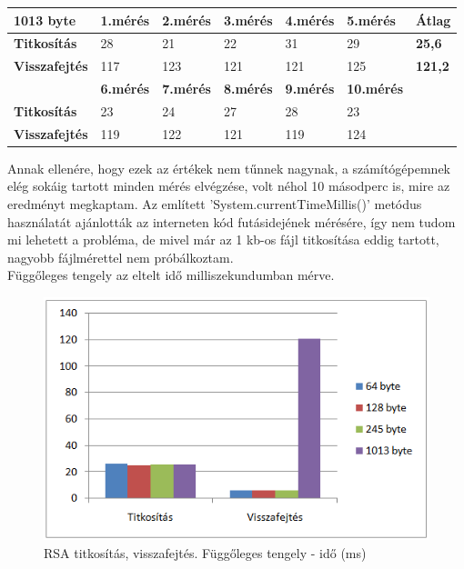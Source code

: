 \begin{center}
	
	
	\begin{tabular}{|p{2.4cm}|p{1.6cm}|p{1.6cm}|p{1.7cm}|p{1.7cm}|p{1.8cm}|p{1.5cm}|}
		\hline
		\textbf{1013 byte} & \textbf{1.mérés} & \textbf{2.mérés} & \textbf{3.mérés} & \textbf{4.mérés} & \textbf{5.mérés} & \textbf{Átlag} \\
		\hline
		\textbf{Titkosítás}&28&21&22&31&29& \textbf{25,6} \\
		\hline
		\textbf{Visszafejtés}&117&123&121&121&125& \textbf{121,2} \\
		\hline
		& \textbf{6.mérés} & \textbf{7.mérés} & \textbf{8.mérés} & \textbf{9.mérés} & \textbf{10.mérés} & \\
		\hline
		\textbf{Titkosítás}&23&24&27&28&23&\\
		\hline
		\textbf{Visszafejtés}&119&122&121&119&124&\\
		\hline
	\end{tabular}
\end{center}

Annak ellenére, hogy ezek az értékek nem  tűnnek nagynak, a számítógépemnek elég sokáig tartott minden mérés elvégzése, volt néhol 10 másodperc is, mire az eredményt megkaptam. Az említett ’System.currentTimeMillis()’ metódus használatát ajánlották az interneten kód futásidejének mérésére, így nem tudom mi lehetett a probléma, de mivel már az 1 kb-os fájl titkosítása eddig tartott, nagyobb fájlmérettel nem próbálkoztam.
\vspace{5pt} \\Függőleges tengely az eltelt idő milliszekundumban mérve.

\begin{figure}[h]
	\centering
	\includegraphics[scale=0.8]{images/alg_graf_4.png}
	\caption{RSA titkosítás, visszafejtés. Függőleges tengely - idő (ms)}
	\label{fig:rsa_graf}
\end{figure}


